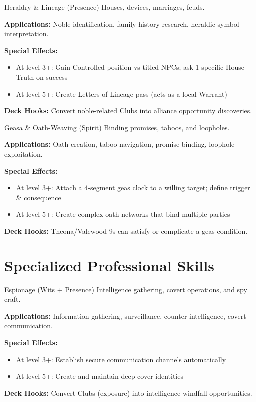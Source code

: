 \begin{skillbox}{Heraldry \& Lineage (Presence)}
Houses, devices, marriages, feuds.

\textbf{Applications:} Noble identification, family history research, heraldic symbol interpretation.

\textbf{Special Effects:}
\begin{itemize}
    \item At level 3+: Gain Controlled position vs titled NPCs; ask 1 specific House-Truth on success
    \item At level 5+: Create Letters of Lineage pass (acts as a local Warrant)
\end{itemize}

\textbf{Deck Hooks:} Convert noble-related Clubs into alliance opportunity discoveries.
\end{skillbox}

\begin{skillbox}{Geasa \& Oath-Weaving (Spirit)}
Binding promises, taboos, and loopholes.

\textbf{Applications:} Oath creation, taboo navigation, promise binding, loophole exploitation.

\textbf{Special Effects:}
\begin{itemize}
    \item At level 3+: Attach a 4-segment geas clock to a willing target; define trigger \& consequence
    \item At level 5+: Create complex oath networks that bind multiple parties
\end{itemize}

\textbf{Deck Hooks:} Theona/Valewood 9s can satisfy or complicate a geas condition.
\end{skillbox}

\section{Specialized Professional Skills}

\begin{skillbox}{Espionage (Wits + Presence)}
Intelligence gathering, covert operations, and spy craft.

\textbf{Applications:} Information gathering, surveillance, counter-intelligence, covert communication.

\textbf{Special Effects:}
\begin{itemize}
    \item At level 3+: Establish secure communication channels automatically
    \item At level 5+: Create and maintain deep cover identities
\end{itemize}

\textbf{Deck Hooks:} Convert Clubs (exposure) into intelligence windfall opportunities.
\end{skillbox}

